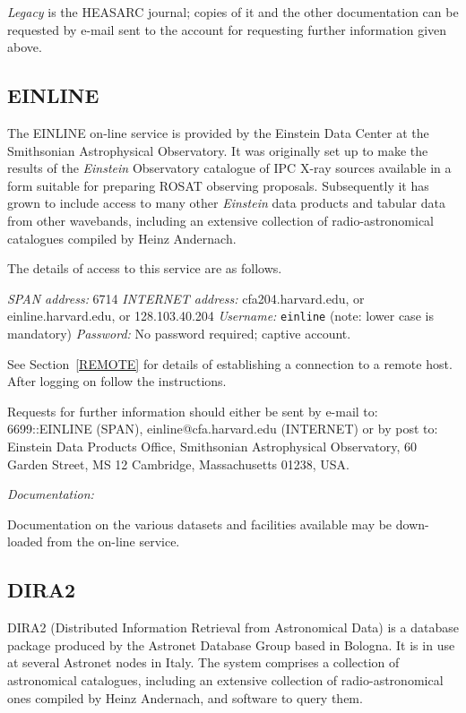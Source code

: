 \documentclass[twoside,11pt,nolof]{starlink}
\begin{document}
\textit{Legacy} is the HEASARC journal; copies of it and the other
documentation can be requested by e-mail sent to the account for
requesting further information given above.

\subsection{EINLINE}

The EINLINE on-line service is provided by the Einstein Data Center at
the Smithsonian Astrophysical Observatory. It was originally set up to
make the results of the \textit{Einstein} Observatory catalogue of IPC
X-ray sources available in a form suitable for preparing ROSAT observing
proposals. Subsequently it has grown to include access to many other
\textit{Einstein} data products and tabular data from other wavebands,
including an extensive collection of radio-astronomical catalogues
compiled by Heinz Andernach.

The details of access to this service are as follows.

\textit{SPAN address: } 6714
\newline \textit{INTERNET address:} cfa204.harvard.edu, or
einline.harvard.edu, or 128.103.40.204
\newline \textit{Username:} \verb-einline- (note: lower case is mandatory)
\newline \textit{Password:} No password required; captive account.

See Section~\ref{REMOTE} for details of establishing a connection to
a remote host. After logging on follow the instructions.

Requests for further information should either be sent by e-mail to:
6699::EINLINE (SPAN), einline@cfa.harvard.edu (INTERNET) or by post to:
Einstein Data Products Office, Smithsonian Astrophysical Observatory,
60 Garden Street, MS 12 Cambridge, Massachusetts 01238, USA.

\textit{Documentation:}

Documentation on the various datasets and facilities available may be
down-loaded from the on-line service.

\subsection{DIRA2}

DIRA2 (Distributed Information Retrieval from Astronomical Data) is a
database package produced by the Astronet Database Group based in
Bologna. It is in use at several Astronet nodes in Italy. The system
comprises a collection of astronomical catalogues, including an
extensive collection of radio-astronomical ones compiled by Heinz
Andernach, and software to query
them.
\end{document}
